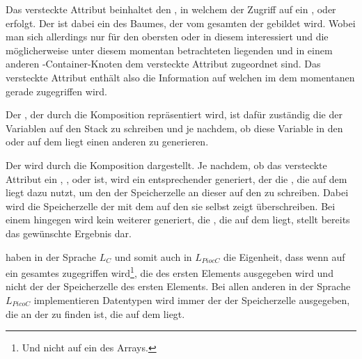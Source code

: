 Das \textcolor{gray!90!black}{versteckte Attribut}  beinhaltet den , in welchem der Zugriff auf ein ,  oder  erfolgt. Der  ist dabei ein  des Baumes, der vom gesamten  der  gebildet wird. Wobei man sich allerdings nur für den obersten  oder  in diesem  interessiert und die möglicherweise unter diesem momentan betrachteten  liegenden  und  in einem anderen -Container-Knoten dem \textcolor{gray!90!black}{versteckte Attribut} zugeordnet sind. Das \textcolor{gray!90!black}{versteckte Attribut}  enthält also die Information auf welchen  im dem momentanen  gerade zugegriffen wird.

Der , der durch die Komposition  repräsentiert wird, ist dafür zuständig die  der Variablen  auf den Stack zu schreiben und je nachdem, ob diese Variable in den  oder auf dem  liegt einen anderen  zu generieren.

Der  wird durch die Komposition  dargestellt. Je nachdem, ob  das \textcolor{gray!90!black}{versteckte Attribut}  ein , ,  oder  ist, wird ein entsprechender  generiert, der die , die auf dem  liegt dazu nutzt, um den  der Speicherzelle an dieser  auf den  zu schreiben. Dabei wird die Speicherzelle der  mit dem  auf den sie selbst zeigt überschreiben. Bei einem  hingegen wird kein weiterer  generiert, die , die auf dem  liegt, stellt bereits das gewünschte Ergebnis dar.

 haben in der Sprache $L_C$ und somit auch in $L_{PiocC}$ die Eigenheit, dass wenn auf ein gesamtes  zugegriffen wird\footnote{Und nicht auf ein  des Arrays.}, die  des ersten Elements ausgegeben wird und nicht der  der Speicherzelle des ersten Elements. Bei allen anderen in der Sprache $L_{PicoC}$ implementieren Datentypen wird immer der  der Speicherzelle ausgegeben, die an der  zu finden ist, die auf dem  liegt.


